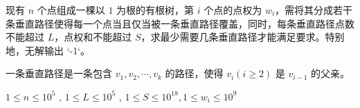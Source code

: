 现有 $n$ 个点组成一棵以 $1$ 为根的有根树，第 $i$ 个点的点权为 $w_i$，需将其分成若干条垂直路径使得每一个点当且仅当被一条垂直路径覆盖，同时，每条垂直路径点数不能超过 $L$，点权和不能超过 $S$，求最少需要几条垂直路径才能满足要求。特别地，无解输出 `-1`。

一条垂直路径是一条包含 $v_1, v_2, \cdots, v_k$ 的路径，使得 $v_i(i\ge2)$ 是 $v_{i-1}$ 的父亲。

$ 1 \le n \le 10^5 $ , $ 1 \le L \le 10^5 $ , $ 1 \le S \le 10^{18} , 1 \le w_i \le 10^9$